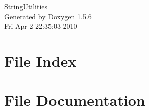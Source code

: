 \documentclass[a4paper]{article}
\begin{document}
\begin{titlepage}
\vspace*{7cm}
\begin{center}
{\Large StringUtilities }\\
\vspace*{1cm}
{\large Generated by Doxygen 1.5.6}\\
\vspace*{0.5cm}
{\small Fri Apr 2 22:35:03 2010}\\
\end{center}
\end{titlepage}
\tableofcontents
{}
\section{File Index}

\section{File Documentation}


\printindex
\end{document}
